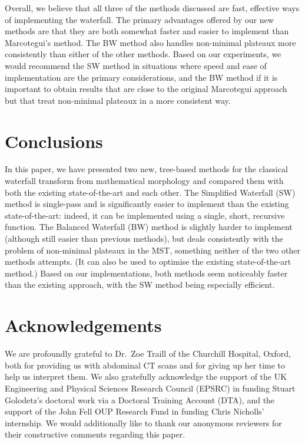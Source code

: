 \documentclass[preprint,a4paper]{elsarticle}
\begin{document}
Overall, we believe that all three of the methods discussed are fast, effective ways of implementing the waterfall. The primary advantages offered by our new methods are that they are both somewhat faster and easier to implement than Marcotegui's method. The BW method also handles non-minimal plateaux more consistently than either of the other methods. Based on our experiments, we would recommend the SW method in situations where speed and ease of implementation are the primary considerations, and the BW method if it is important to obtain results that are close to the original Marcotegui approach but that treat non-minimal plateaux in a more consistent way.

\section{Conclusions}
\label{sec:conclusions}

In this paper, we have presented two new, tree-based methods for the classical waterfall transform from mathematical morphology and compared them with both the existing state-of-the-art and each other. The Simplified Waterfall (SW) method is single-pass and is significantly easier to implement than the existing state-of-the-art: indeed, it can be implemented using a single, short, recursive function. The Balanced Waterfall (BW) method is slightly harder to implement (although still easier than previous methods), but deals consistently with the problem of non-minimal plateaux in the MST, something neither of the two other methods attempts. (It can also be used to optimise the existing state-of-the-art method.) Based on our implementations, both methods seem noticeably faster than the existing approach, with the SW method being especially efficient.

\section{Acknowledgements}
\label{sec:acknowledgements}

We are profoundly grateful to Dr.\ Zoe Traill of the Churchill Hospital, Oxford, both for providing us with abdominal CT scans and for giving up her time to help us interpret them. We also gratefully acknowledge the support of the UK Engineering and Physical Sciences Research Council (EPSRC) in funding Stuart Golodetz's doctoral work via a Doctoral Training Account (DTA), and the support of the John Fell OUP Research Fund in funding Chris Nicholls' internship. We would additionally like to thank our anonymous reviewers for their constructive comments regarding this paper.



\end{document}
